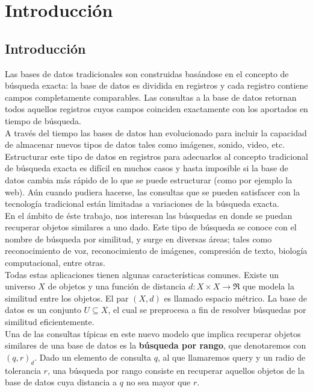 \chapter{Introducci\'on}

\section{Introducci\'on}
Las bases de datos tradicionales son construidas bas\'andose en el concepto de b\'usqueda exacta: la base de datos es dividida en registros y cada registro contiene campos completamente comparables. Las consultas a la base de datos retornan todos aquellos registros cuyos campos coinciden exactamente con los aportados en tiempo de b\'usqueda.\\
				
A trav\'es del tiempo las bases de datos han evolucionado para incluir la capacidad de almacenar nuevos tipos de datos tales como im\'agenes, sonido, video, etc. Estructurar este tipo de datos en registros para adecuarlos al concepto tradicional de b\'usqueda exacta es dif\'icil en muchos casos y hasta imposible si la base de datos cambia m\'as r\'apido de lo que se puede estructurar (como por ejemplo la web). A\'un cuando pudiera hacerse, las consultas que se pueden satisfacer con la tecnolog\'ia tradicional est\'an limitadas a variaciones de la b\'usqueda exacta.\\
					
En el \'ambito de \'este trabajo, nos interesan las b\'usquedas en donde se puedan recuperar objetos similares a uno dado. Este tipo de b\'usqueda se conoce con el nombre de b\'usqueda por similitud, y surge en diversas \'areas; tales como reconocimiento de voz, reconocimiento de im\'agenes, compresi\'on de texto, biolog\'ia computacional, entre otras.\\
					
Todas estas aplicaciones tienen algunas caracter\'isticas comunes. Existe un universo $X$ de objetos y una funci\'on de distancia $d: X \times X \rightarrow \Re$ que modela la similitud entre los objetos. El par $(X, d)$ es llamado espacio m\'etrico. La base de datos es un conjunto $U \subseteq X$, el cual se preprocesa a fin de resolver b\'usquedas por similitud eficientemente.\\
					
Una de las consultas t\'ipicas en este nuevo modelo que implica recuperar objetos similares de una base de datos es la \textbf{b\'usqueda por rango}, que denotaremos con $(q, r)_d$. Dado un elemento de consulta $q$, al que llamaremos query y un radio de tolerancia $r$, una b\'usqueda por rango consiste en recuperar aquellos objetos de la base de datos cuya distancia a $q$ no sea mayor que $r$.\\

